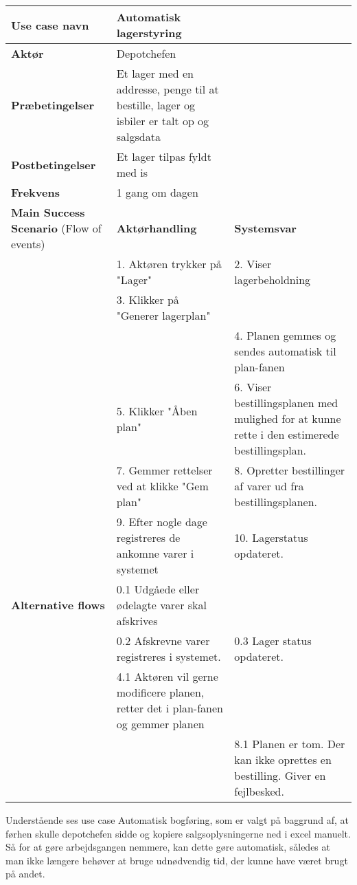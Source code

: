 \begin{longtable}{ |p{120pt}|p{120pt}|p{120pt}| }
    \hline
    \textbf{Use case navn} & Automatisk lagerstyring & \\
    \hline
    \textbf{Aktør} & Depotchefen & \\
    \hline
    \textbf{Præbetingelser} & Et lager med en addresse, penge til at bestille, lager og isbiler er talt op og salgsdata & \\
    \hline
    \textbf{Postbetingelser} & Et lager tilpas fyldt med is & \\
    \hline
    \textbf{Frekvens} & 1 gang om dagen & \\
    \hline
    \textbf{Main Success Scenario} (Flow of events) & \textbf{Aktørhandling} & \textbf{Systemsvar} \\
    \hline
    & 1. Aktøren trykker på "Lager" & 2. Viser lagerbeholdning \\
    \hline
    & 3. Klikker på "Generer lagerplan" &  \\
    & & 4. Planen gemmes og sendes automatisk til plan-fanen \\
    \hline
    & 5. Klikker "Åben plan" & 6. Viser bestillingsplanen med mulighed for at kunne rette i den estimerede bestillingsplan. \\
    \hline
    & 7. Gemmer rettelser ved at klikke "Gem plan" & 8. Opretter bestillinger af varer ud fra bestillingsplanen. \\
    \hline
    & 9. Efter nogle dage registreres de ankomne varer i systemet & 10. Lagerstatus opdateret. \\
    \hline
    \textbf{Alternative flows} & 0.1 Udgåede eller ødelagte varer skal afskrives & \\
    \hline
    & 0.2 Afskrevne varer registreres i systemet. & 0.3 Lager status opdateret. \\
    \hline
    & 4.1 Aktøren vil gerne modificere planen, retter det i plan-fanen og gemmer planen & \\
    \hline
    & & 8.1 Planen er tom. Der kan ikke oprettes en bestilling. Giver en fejlbesked. \\
    \hline
\end{longtable}


Understående ses use case Automatisk bogføring, som er valgt på baggrund af, at førhen skulle depotchefen sidde og kopiere salgsoplysningerne ned i excel manuelt. Så for at gøre arbejdsgangen nemmere, kan dette gøre automatisk, således at man ikke længere behøver at bruge udnødvendig tid, der kunne have været brugt på andet. 

